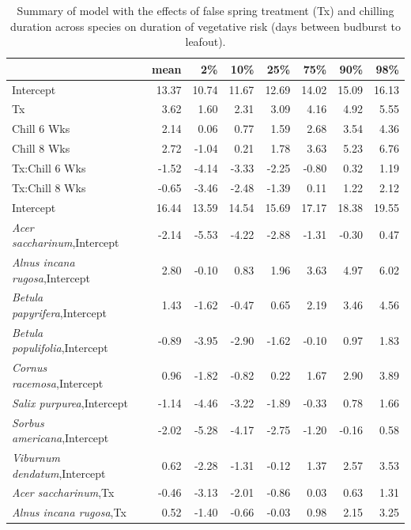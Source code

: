 \documentclass{article}\usepackage[]{graphicx}\usepackage[]{color}
\begin{document}
\newpage
\begin{longtable}{lrrrrrrr}
\caption{Summary of model with the effects of false spring treatment (Tx) and chilling duration across species on duration of vegetative risk (days between budburst to leafout).} \\ 
  \hline
 & mean & 2\% & 10\% & 25\% & 75\% & 90\% & 98\% \\ 
  \hline \endhead  \hline
Intercept & 13.37 & 10.74 & 11.67 & 12.69 & 14.02 & 15.09 & 16.13 \\ 
  Tx & 3.62 & 1.60 & 2.31 & 3.09 & 4.16 & 4.92 & 5.55 \\ 
  Chill 6 Wks & 2.14 & 0.06 & 0.77 & 1.59 & 2.68 & 3.54 & 4.36 \\ 
  Chill 8 Wks & 2.72 & -1.04 & 0.21 & 1.78 & 3.63 & 5.23 & 6.76 \\ 
  Tx:Chill 6 Wks & -1.52 & -4.14 & -3.33 & -2.25 & -0.80 & 0.32 & 1.19 \\ 
  Tx:Chill 8 Wks & -0.65 & -3.46 & -2.48 & -1.39 & 0.11 & 1.22 & 2.12 \\ 
  Intercept & 16.44 & 13.59 & 14.54 & 15.69 & 17.17 & 18.38 & 19.55 \\ 
  \textit{Acer saccharinum},Intercept & -2.14 & -5.53 & -4.22 & -2.88 & -1.31 & -0.30 & 0.47 \\ 
  \textit{Alnus incana rugosa},Intercept & 2.80 & -0.10 & 0.83 & 1.96 & 3.63 & 4.97 & 6.02 \\ 
  \textit{Betula papyrifera},Intercept & 1.43 & -1.62 & -0.47 & 0.65 & 2.19 & 3.46 & 4.56 \\ 
  \textit{Betula populifolia},Intercept & -0.89 & -3.95 & -2.90 & -1.62 & -0.10 & 0.97 & 1.83 \\ 
  \textit{Cornus racemosa},Intercept & 0.96 & -1.82 & -0.82 & 0.22 & 1.67 & 2.90 & 3.89 \\ 
  \textit{Salix purpurea},Intercept & -1.14 & -4.46 & -3.22 & -1.89 & -0.33 & 0.78 & 1.66 \\ 
  \textit{Sorbus americana},Intercept & -2.02 & -5.28 & -4.17 & -2.75 & -1.20 & -0.16 & 0.58 \\ 
  \textit{Viburnum dendatum},Intercept & 0.62 & -2.28 & -1.31 & -0.12 & 1.37 & 2.57 & 3.53 \\ 
  \textit{Acer saccharinum},Tx & -0.46 & -3.13 & -2.01 & -0.86 & 0.03 & 0.63 & 1.31 \\ 
  \textit{Alnus incana rugosa},Tx & 0.52 & -1.40 & -0.66 & -0.03 & 0.98 & 2.15 & 3.25 \\ 

\end{longtable}
\end{document}

